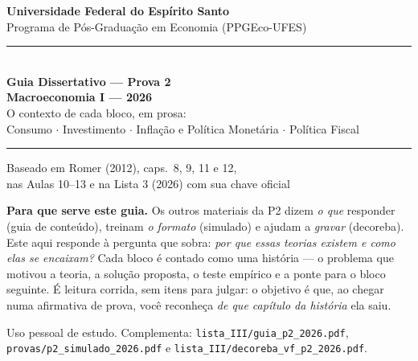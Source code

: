 \documentclass[12pt, a4paper]{article}
\begin{document}

\begin{titlepage}
\begin{center}
\vspace*{1.5cm}
{\Large\bfseries Universidade Federal do Espírito Santo}\\[0.5em]
{\large Programa de Pós-Graduação em Economia (PPGEco-UFES)}\\[2em]

\rule{\linewidth}{1.2pt}\\[0.8em]
{\LARGE\bfseries\color{cyanrbc} Guia Dissertativo --- Prova 2\\[0.4em]
\large Macroeconomia I --- 2026}\\[0.4em]
{\normalsize\color{grayrbc} O contexto de cada bloco, em prosa:\\
Consumo $\cdot$ Investimento $\cdot$ Inflação e Política Monetária $\cdot$ Política Fiscal}\\[0.8em]
\rule{\linewidth}{1.2pt}

\vspace{1.5em}
{\large Baseado em Romer (2012), caps.\ 8, 9, 11 e 12,\\
nas Aulas 10--13 e na Lista 3 (2026) com sua chave oficial}

\vspace{2em}
\begin{tcolorbox}[standard, colback=provabg, colframe=provaborder, width=0.9\textwidth,
  arc=4pt, boxrule=1.2pt, left=8pt, right=8pt, top=6pt, bottom=6pt]
\raggedright
\textbf{\textcolor{provaborder}{Para que serve este guia.}} Os outros
materiais da P2 dizem \emph{o que} responder (guia de conteúdo), treinam
\emph{o formato} (simulado) e ajudam a \emph{gravar} (decoreba). Este aqui
responde à pergunta que sobra: \emph{por que essas teorias existem e como
elas se encaixam?} Cada bloco é contado como uma história --- o problema que
motivou a teoria, a solução proposta, o teste empírico e a ponte para o bloco
seguinte. É leitura corrida, sem itens para julgar: o objetivo é que, ao
chegar numa afirmativa de prova, você reconheça \emph{de que capítulo da
história} ela saiu.
\end{tcolorbox}

\vfill
{\small Uso pessoal de estudo. Complementa: \texttt{lista\_III/guia\_p2\_2026.pdf},
\texttt{provas/p2\_simulado\_2026.pdf} e \texttt{lista\_III/decoreba\_vf\_p2\_2026.pdf}.}
\end{center}
\end{titlepage}
\end{document}
